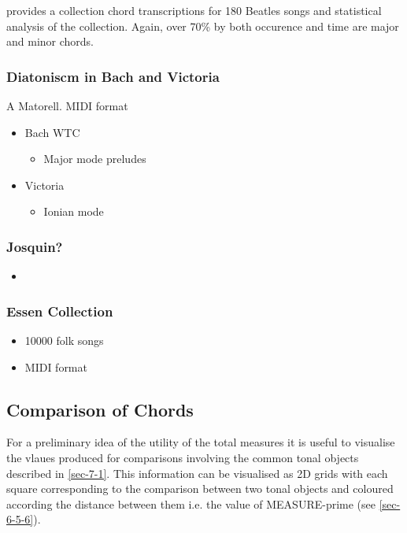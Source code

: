 \documentclass{article}
\begin{document}
\citet[chap. 6]{Harte2010} provides a collection chord transcriptions
for 180 Beatles songs and statistical analysis of the
collection. Again, over 70\% by both occurence and time are major and
minor chords.
\subsubsection{Diatoniscm in Bach and Victoria}
\label{sec-7-2-3}

A Matorell. MIDI format
\begin{itemize}
\item Bach WTC
\begin{itemize}
\item Major mode preludes
\end{itemize}
\item Victoria
\begin{itemize}
\item Ionian mode
\end{itemize}
\end{itemize}
\subsubsection{Josquin?}
\label{sec-7-2-4}

\begin{itemize}
\item 
\end{itemize}
\subsubsection{Essen Collection}
\label{sec-7-2-5}

\begin{itemize}
\item 10000 folk songs
\item MIDI format
\end{itemize}
\subsection{Comparison of Chords}
\label{sec-7-3}

For a preliminary idea of the utility of the total measures it is
useful to visualise the vlaues produced for comparisons involving the
common tonal objects described in \ref{sec-7-1}. This information
can be visualised as 2D grids with each square corresponding to the
comparison between two tonal objects and coloured according the
distance between them i.e. the value of MEASURE-prime (see \ref{sec-6-5-6}).
\end{document}
